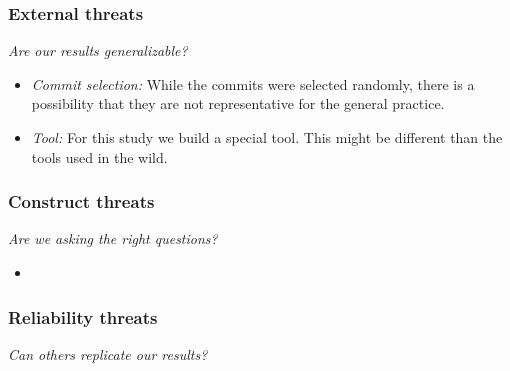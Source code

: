 \documentclass{beamer}
\begin{document}
\begin{frame}
\frametitle{External threats}
\emph{Are our results generalizable?}

\begin{itemize}
	\item{\emph{Commit selection:}} While the commits were selected randomly, there is a possibility that they are not representative for the general practice. 
	\item{\emph{Tool:}} For this study we build a special tool. 
	This might be different than the tools used in the wild.
\end{itemize}
\end{frame}

\begin{frame}
\frametitle{Construct threats}

\emph{Are we asking the right questions?}

\begin{itemize}
	\item
\end{itemize}
\end{frame}

\begin{frame}
\frametitle{Reliability threats}
\emph{Can others replicate our results?}

\end{frame}
\end{document}
